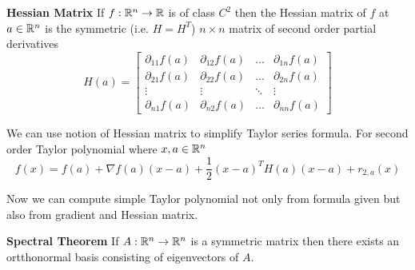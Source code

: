 \documentclass[11pt]{article}
\begin{document}
\begin{defn}
  \label{Hessian Matrix}\textbf{Hessian Matrix} If $f:\mathbb{R}^n \rightarrow \mathbb{R}$ is of class $C^2$ then the Hessian matrix of $f$ at $a\in\mathbb{R}^n$ is the symmetric (i.e. $H = H^T$) $n\times n$ matrix of second order partial derivatives
  \[
    H(a) =
    \begin{bmatrix}
      \partial_{11}f(a) & \partial_{12} f(a) & \dots  & \partial_{1n} f(a) \\
      \partial_{21}f(a) & \partial_{22} f(a) & \dots  & \partial_{2n} f(a) \\
      \vdots & \vdots & \ddots & \vdots \\
      \partial_{n1} f(a) & \partial_{n2} f(a) & \dots  & \partial_{nn} f(a)
    \end{bmatrix}
  \]
  \begin{rem}
    We can use notion of Hessian matrix to simplify Taylor series formula. For second order Taylor polynomial where $x,a\in\mathbb{R}^n$
    \[
      f(x) = f(a) + \nabla f(a) (x-a) + \frac{1}{2} (x-a)^T H(a) (x-a) + r_{2, a} (x)
    \]
  \end{rem}
  Now we can compute simple Taylor polynomial not only from formula given but also from gradient and Hessian matrix.
\end{defn}

\begin{theorem}
  \label{Spectral Theorem} \textbf{Spectral Theorem} If $A: \mathbb{R}^n \rightarrow \mathbb{R}^n$ is a symmetric matrix then there exists an ortthonormal basis consisting of eigenvectors of $A$.
\end{theorem}
\end{document}
